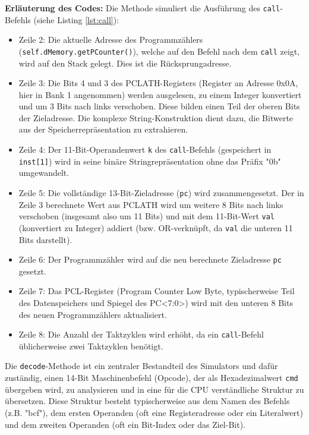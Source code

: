 \textbf{Erläuterung des Codes:}
Die Methode simuliert die Ausführung des \texttt{call}-Befehls (siehe Listing \ref{lst:call}):
\begin{itemize}
    \item Zeile 2: Die aktuelle Adresse des Programmzählers (\texttt{self.dMemory.getPCounter()}), welche auf den Befehl nach dem \texttt{call} zeigt, wird auf den Stack gelegt. Dies ist die Rücksprungadresse.
    \item Zeile 3: Die Bits 4 und 3 des PCLATH-Registers (Register an Adresse 0x0A, hier in Bank 1 angenommen) werden ausgelesen, zu einem Integer konvertiert und um 3 Bits nach links verschoben. Diese bilden einen Teil der oberen Bits der Zieladresse. Die komplexe String-Konstruktion dient dazu, die Bitwerte aus der Speicherrepräsentation zu extrahieren.
    \item Zeile 4: Der 11-Bit-Operandenwert \texttt{k} des \texttt{call}-Befehls (gespeichert in \texttt{inst[1]}) wird in seine binäre Stringrepräsentation ohne das Präfix "0b" umgewandelt.
    \item Zeile 5: Die vollständige 13-Bit-Zieladresse (\texttt{pc}) wird zusammengesetzt. Der in Zeile 3 berechnete Wert aus PCLATH wird um weitere 8 Bits nach links verschoben (insgesamt also um 11 Bits) und mit dem 11-Bit-Wert \texttt{val} (konvertiert zu Integer) addiert (bzw. OR-verknüpft, da \texttt{val} die unteren 11 Bits darstellt).
    \item Zeile 6: Der Programmzähler wird auf die neu berechnete Zieladresse \texttt{pc} gesetzt.
    \item Zeile 7: Das PCL-Register (Program Counter Low Byte, typischerweise Teil des Datenspeichers und Spiegel des PC<7:0>) wird mit den unteren 8 Bits des neuen Programmzählers aktualisiert.
    \item Zeile 8: Die Anzahl der Taktzyklen wird erhöht, da ein \texttt{call}-Befehl üblicherweise zwei Taktzyklen benötigt.
\end{itemize}

Die \texttt{decode}-Methode ist ein zentraler Bestandteil des Simulators und dafür zuständig, einen 14-Bit Maschinenbefehl (Opcode), der als Hexadezimalwert \texttt{cmd} übergeben wird, zu analysieren und in eine für die CPU verständliche Struktur zu übersetzen. Diese Struktur besteht typischerweise aus dem Namen des Befehls (z.B. "bcf"), dem ersten Operanden (oft eine Registeradresse oder ein Literalwert) und dem zweiten Operanden (oft ein Bit-Index oder das Ziel-Bit).

